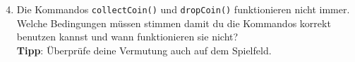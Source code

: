 \begin{enumerate}\setcounter{enumi}{3}
    \item Die Kommandos \lstinline{collectCoin()} und \lstinline{dropCoin()} funktionieren nicht immer.
        Welche Bedingungen müssen stimmen damit du die Kommandos korrekt benutzen kannst und wann funktionieren sie nicht?\\
        \textbf{Tipp}: Überprüfe deine Vermutung auch auf dem Spielfeld.\\
\end{enumerate}
